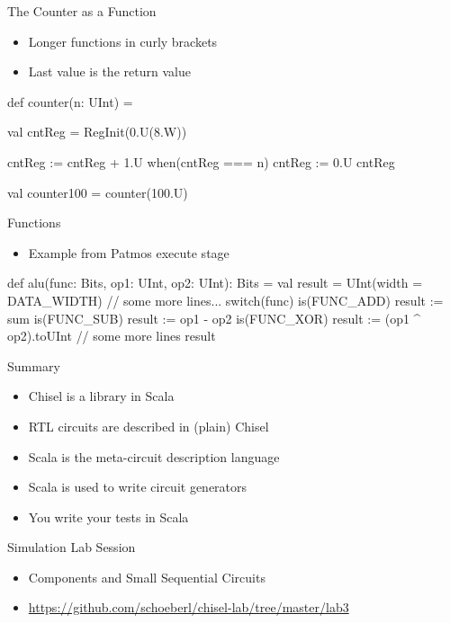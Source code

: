 \begin{frame}[fragile]{The Counter as a Function}
\begin{itemize}
\item Longer functions in curly brackets
\item Last value is the return value
\end{itemize}
\begin{chisel}
def counter(n: UInt) = {
  
  val cntReg = RegInit(0.U(8.W))
  
  cntReg := cntReg + 1.U
  when(cntReg === n) {
    cntReg := 0.U
  }
  cntReg
}

val counter100 = counter(100.U)
\end{chisel}
\end{frame}


\begin{frame}[fragile]{Functions}
\begin{itemize}
\item Example from Patmos execute stage
\end{itemize}
\begin{chisel}
def alu(func: Bits, op1: UInt, op2: UInt): Bits = {
  val result = UInt(width = DATA_WIDTH)
  // some more lines...
  switch(func) {
    is(FUNC_ADD) { result := sum }
    is(FUNC_SUB) { result := op1 - op2 }
    is(FUNC_XOR) { result := (op1 ^ op2).toUInt }
    // some more lines
  }
  result
}
\end{chisel}
\end{frame}



\begin{frame}[fragile]{Summary}
\begin{itemize}
\item Chisel is a library in Scala
\item RTL circuits are described in (plain) Chisel
\item Scala is the meta-circuit description language
\item Scala is used to write circuit generators
\item You write your tests in Scala
\end{itemize}
\end{frame}

\begin{frame}[fragile]{Simulation Lab Session}
\begin{itemize}
\item Components and Small Sequential Circuits
\item \url{https://github.com/schoeberl/chisel-lab/tree/master/lab3}
\end{itemize}
\end{frame}

